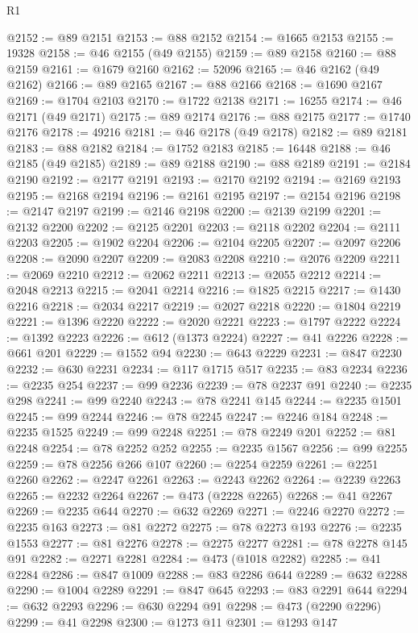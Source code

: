 \begin{lexlean}{R1}
\begin{coremodule}
@2152 := @89 @2151
@2153 := @88 @2152
@2154 := @1665 @2153
@2155 := 19328
@2158 := @46 @2155 (@49 @2155)
@2159 := @89 @2158
@2160 := @88 @2159
@2161 := @1679 @2160
@2162 := 52096
@2165 := @46 @2162 (@49 @2162)
@2166 := @89 @2165
@2167 := @88 @2166
@2168 := @1690 @2167
@2169 := @1704 @2103
@2170 := @1722 @2138
@2171 := 16255
@2174 := @46 @2171 (@49 @2171)
@2175 := @89 @2174
@2176 := @88 @2175
@2177 := @1740 @2176
@2178 := 49216
@2181 := @46 @2178 (@49 @2178)
@2182 := @89 @2181
@2183 := @88 @2182
@2184 := @1752 @2183
@2185 := 16448
@2188 := @46 @2185 (@49 @2185)
@2189 := @89 @2188
@2190 := @88 @2189
@2191 := @2184 @2190
@2192 := @2177 @2191
@2193 := @2170 @2192
@2194 := @2169 @2193
@2195 := @2168 @2194
@2196 := @2161 @2195
@2197 := @2154 @2196
@2198 := @2147 @2197
@2199 := @2146 @2198
@2200 := @2139 @2199
@2201 := @2132 @2200
@2202 := @2125 @2201
@2203 := @2118 @2202
@2204 := @2111 @2203
@2205 := @1902 @2204
@2206 := @2104 @2205
@2207 := @2097 @2206
@2208 := @2090 @2207
@2209 := @2083 @2208
@2210 := @2076 @2209
@2211 := @2069 @2210
@2212 := @2062 @2211
@2213 := @2055 @2212
@2214 := @2048 @2213
@2215 := @2041 @2214
@2216 := @1825 @2215
@2217 := @1430 @2216
@2218 := @2034 @2217
@2219 := @2027 @2218
@2220 := @1804 @2219
@2221 := @1396 @2220
@2222 := @2020 @2221
@2223 := @1797 @2222
@2224 := @1392 @2223
@2226 := @612 (@1373 @2224)
@2227 := @41 @2226
@2228 := @661 @201
@2229 := @1552 @94
@2230 := @643 @2229
@2231 := @847 @2230
@2232 := @630 @2231
@2234 := @117 @1715 @517
@2235 := @83 @2234
@2236 := @2235 @254
@2237 := @99 @2236
@2239 := @78 @2237 @91
@2240 := @2235 @298
@2241 := @99 @2240
@2243 := @78 @2241 @145
@2244 := @2235 @1501
@2245 := @99 @2244
@2246 := @78 @2245
@2247 := @2246 @184
@2248 := @2235 @1525
@2249 := @99 @2248
@2251 := @78 @2249 @201
@2252 := @81 @2248
@2254 := @78 @2252 @252
@2255 := @2235 @1567
@2256 := @99 @2255
@2259 := @78 @2256 @266 @107
@2260 := @2254 @2259
@2261 := @2251 @2260
@2262 := @2247 @2261
@2263 := @2243 @2262
@2264 := @2239 @2263
@2265 := @2232 @2264
@2267 := @473 (@2228 @2265)
@2268 := @41 @2267
@2269 := @2235 @644
@2270 := @632 @2269
@2271 := @2246 @2270
@2272 := @2235 @163
@2273 := @81 @2272
@2275 := @78 @2273 @193
@2276 := @2235 @1553
@2277 := @81 @2276
@2278 := @2275 @2277
@2281 := @78 @2278 @145 @91
@2282 := @2271 @2281
@2284 := @473 (@1018 @2282)
@2285 := @41 @2284
@2286 := @847 @1009
@2288 := @83 @2286 @644
@2289 := @632 @2288
@2290 := @1004 @2289
@2291 := @847 @645
@2293 := @83 @2291 @644
@2294 := @632 @2293
@2296 := @630 @2294 @91
@2298 := @473 (@2290 @2296)
@2299 := @41 @2298
@2300 := @1273 @11
@2301 := @1293 @147

\end{coremodule}
\end{lexlean}
